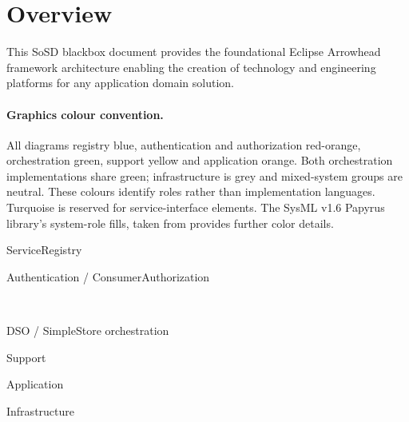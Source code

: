 \documentclass[a4paper]{arrowhead}
\begin{document}
\begin{center}
\begin{abstract}
    The primary purpose of the document is to present the foundational
    architectural aspects thus necessary and often needed core and
    support systems. Implementation specifications are described
    in the white box GSoSDD documents \cite{gsosddcore,gsosddsup} and
    the core and support system SysDD
    and IDD documents for implementation detail located in each system repository.. The document supersedes \emph{GSoSD Arrowhead
    Core Systems 5.0 v1.2} \cite{gsosd50} and the draft \emph{GSoSD Arrowhead Support Systems 5.0}
    \cite{gsosdsup50}.
  \end{abstract}

  \vspace*{0.6cm}
\end{center}

\newpage
\tableofcontents
\newpage

\section{Overview}
\label{sec:overview}

This SoSD blackbox document provides the foundational Eclipse
Arrowhead framework architecture enabling the creation of technology
and engineering platforms for any application domain solution.

\paragraph{Graphics colour convention.}
All diagrams registry blue, authentication
and authorization red-orange, orchestration green, support yellow and application
orange. Both orchestration implementations share 
green; infrastructure is grey and mixed-system groups are neutral. These colours
identify roles rather than implementation languages. Turquoise is
reserved for service-interface elements. The SysML v1.6 Papyrus library's system-role fills, taken from
 provides further
color details.
\begin{center}\scriptsize
\setlength{\fboxsep}{4pt}
\colorbox{AHSysMLRegistry}{\strut ServiceRegistry}\quad
\colorbox{AHSysMLSecurity}{\strut Authentication / ConsumerAuthorization}\\[6pt]
\colorbox{AHSysMLOrchestration}{\strut DSO / SimpleStore orchestration}\quad
\colorbox{AHSysMLSupport}{\strut Support}\quad
\colorbox{AHSysMLApplication}{\strut Application}\quad
\colorbox{AHSysMLInfrastructure}{\strut Infrastructure}
\end{center}
\end{document}
